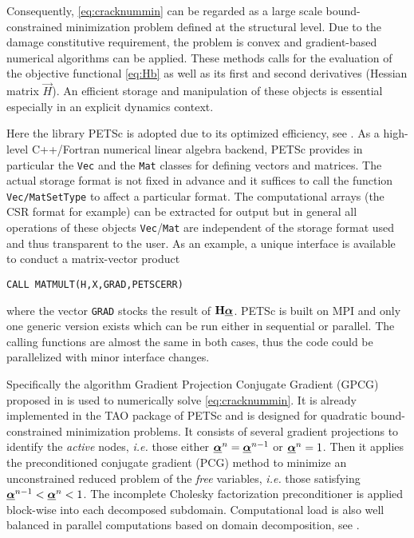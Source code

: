 Consequently, \eqref{eq:cracknummin} can be regarded as a large scale bound-constrained minimization problem defined at the structural level. Due to the damage constitutive requirement, the problem is convex and gradient-based numerical algorithms can be applied. These methods calls for the evaluation of the objective functional \eqref{eq:Hb} as well as its first and second derivatives (Hessian matrix $\vec{H}$). An efficient storage and manipulation of these objects is essential especially in an explicit dynamics context.

Here the library PETSc is adopted due to its optimized efficiency, see \cite{PETSc:2015}. As a high-level C++/Fortran numerical linear algebra backend, PETSc provides in particular the \texttt{Vec} and the \texttt{Mat} classes for defining vectors and matrices. The actual storage format is not fixed in advance and it suffices to call the function \texttt{Vec/MatSetType} to affect a particular format. The computational arrays (the CSR format for example) can be extracted for output but in general all operations of these objects \texttt{Vec}/\texttt{Mat} are independent of the storage format used and thus transparent to the user. As an example, a unique interface is available to conduct a matrix-vector product
\begin{mdframed}[hidealllines=true,backgroundcolor=gray!20]
\begin{verbatim}
CALL MATMULT(H,X,GRAD,PETSCERR)
\end{verbatim}
\end{mdframed}
where the vector \texttt{GRAD} stocks the result of $\vec{H}\dvec$. PETSc is built on MPI and only one generic version exists which can be run either in sequential or parallel. The calling functions are almost the same in both cases, thus the code could be parallelized with minor interface changes.

Specifically the algorithm Gradient Projection Conjugate Gradient (GPCG) proposed in \cite{MoreToraldo:1991} is used to numerically solve \eqref{eq:cracknummin}. It is already implemented in the TAO package of PETSc and is designed for quadratic bound-constrained minimization problems. It consists of several gradient projections to identify the \emph{active} nodes, \emph{i.e.} those either $\dvec^n=\dvec^{n-1}$ or $\dvec^n=1$. Then it applies the preconditioned conjugate gradient (PCG) method to minimize an unconstrained reduced problem of the \emph{free} variables, \emph{i.e.} those satisfying $\dvec^{n-1}<\dvec^n<1$. The incomplete Cholesky factorization preconditioner is applied block-wise into each decomposed subdomain. Computational load is also well balanced in parallel computations based on domain decomposition, see \cite{BensonMcInnesMore:2001}.

